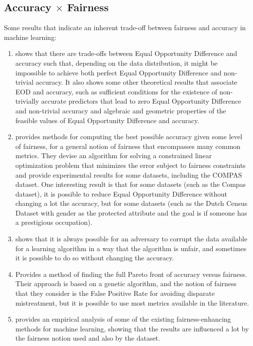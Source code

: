 \subsection{Accuracy $\times$ Fairness}

Some results that indicate an inherent trade-off between fairness and accuracy in machine learning:

\begin{enumerate}
\item \cite{Carlos} shows that there are trade-offs between Equal Opportunity Difference and accuracy such that, depending on the data distribution, it might be impossible to achieve both perfect Equal Opportunity Difference and non-trivial accuracy. It also shows some other theoretical results that associate EOD and accuracy, such as sufficient conditions for the existence of non-trivially accurate predictors that lead to zero Equal Opportunity Difference and non-trivial accuracy and algebraic and geometric properties of the feasible values of Equal Opportunity Difference and accuracy.
\item \cite{Reductions} provides methods for computing the best possible accuracy given some level of fairness, for a general notion of fairness that encompasses many common metrics. They devise an algorithm for solving a constrained linear optimization problem that minimizes the error subject to fairness constraints and provide experimental results for some datasets, including the COMPAS \cite{Compass} dataset. One interesting result is that for some datasets (such as the Compas dataset), it is possible to reduce Equal Opportunity Difference without changing a lot the accuracy, but for some datasets (such as the Dutch Census Dataset\cite{merono2017cedar} with gender as the protected attribute and the goal is if someone has a prestigious occupation).
\item \cite{konstantinov2022impossibility} shows that it is always possible for an adversary to corrupt the data available for a learning algorithm in a way that the algorithm is unfair, and sometimes it is possible to do so without changing the accuracy.
\item \cite{valdivia2021fair} Provides a method of finding the full Pareto front of accuracy versus fairness. Their approach is based on a genetic algorithm, and the notion of fairness that they consider is the False Positive Rate for avoiding disparate mistreatment, but it is possible to use most metrics available in the literature.
\item \cite{friedler2019comparative} provides an empirical analysis of some of the existing fairness-enhancing methods for machine learning, showing that the results are influenced a lot by the fairness notion used and also by the dataset.
\end{enumerate}

